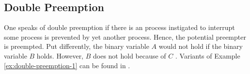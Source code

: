 \documentclass[11pt,a4paper]{book}
\theoremstyle{definition}
\theoremstyle{definition}
\newtheorem{example}{Example}[section]
\theoremstyle{definition}
\theoremstyle{remark}
\begin{document}

%
%
%  
%  
%	


\subsection{Double Preemption}
%


One speaks of double preemption if there is an process instigated to interrupt some process is prevented by yet another process. Hence, the potential preempter is preempted.
Put differently, the binary variable $A$ would not hold if the binary variable $B$ holds. However, $B$ does not hold because of $C$ \parencite{denecker2019explaining}. 
Variants of Example \ref{ex:double-preemption-1} can be found in \parencite{glymour2010actual,beckers2018principled,denecker2018causal,denecker2019explaining}.
\end{document}
